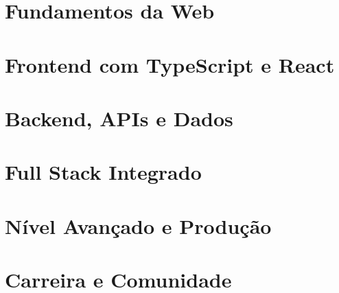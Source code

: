 \documentclass[12pt, a4paper, openany, oneside]{book}
\begin{document}
\frontmatter


\tableofcontents
\clearpage

\mainmatter

\part{Fundamentos da Web}





\part{Frontend com TypeScript e React}






\part{Backend, APIs e Dados}






\part{Full Stack Integrado}






\part{Nível Avançado e Produção}






\part{Carreira e Comunidade}


\appendix







\backmatter
\printbibliography[heading=bibintoc, title={Bibliografia e Fontes Consultadas}]
\printindex
\end{document}
